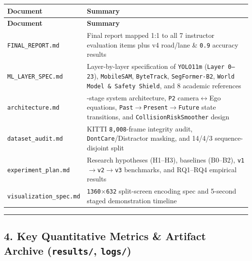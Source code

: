 \documentclass[10.5pt,a4paper]{article}
\begin{document}
\begin{footnotesize}
\setlength{\tabcolsep}{4pt}
\setlength{\LTleft}{0pt}\setlength{\LTright}{0pt}
\begin{longtable}{>{\raggedright\arraybackslash}p{} >{\raggedright\arraybackslash}p{}}
\toprule
\textbf{Document} & \textbf{Summary} \\
\midrule
\endfirsthead
\toprule
\textbf{Document} & \textbf{Summary} \\
\midrule
\endhead
\bottomrule
\endfoot
\texttt{FINAL\_\allowbreak{}REPORT.\allowbreak{}md} & Final report mapped 1:1 to all 7 instructor evaluation items plus v4 road/lane \& \texttt{0.\allowbreak{}9} accuracy results \\
\texttt{ML\_\allowbreak{}LAYER\_\allowbreak{}SPEC.\allowbreak{}md} & Layer-by-layer specification of \texttt{YOLO11m} (\texttt{Layer 0--23}), \texttt{MobileSAM}, \texttt{ByteTrack}, \texttt{SegFormer-\allowbreak{}B2}, \texttt{World Model \& Safety Shield}, and 8 academic references \\
\texttt{architecture.\allowbreak{}md} & 7-stage system architecture, \texttt{P2} camera$\leftrightarrow$Ego equations, \texttt{Past$\rightarrow$Present$\rightarrow$Future} state transitions, and \texttt{CollisionRiskSmoother} design \\
\texttt{dataset\_\allowbreak{}audit.\allowbreak{}md} & KITTI \texttt{8,\allowbreak{}008}-frame integrity audit, \texttt{DontCare}/Distractor masking, and 14/4/3 sequence-disjoint split \\
\texttt{experiment\_\allowbreak{}plan.\allowbreak{}md} & Research hypotheses (H1--H3), baselines (B0--B2), \texttt{v1$\rightarrow$v2$\rightarrow$v3} benchmarks, and RQ1--RQ4 empirical results \\
\texttt{visualization\_\allowbreak{}spec.\allowbreak{}md} & \texttt{1360$\times$632} split-screen encoding spec and 5-second staged demonstration timeline \\
\end{longtable}
\end{footnotesize}


\par\noindent\rule{\textwidth}{0.4pt}\par\medskip

\subsection{4. Key Quantitative Metrics \& Artifact Archive (\texttt{results/\allowbreak{}}, \texttt{logs/\allowbreak{}})}
\end{document}
